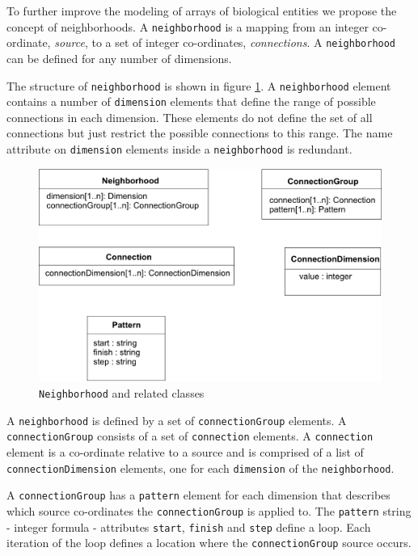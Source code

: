 \documentclass[10pt]{article}
\newcommand{\class}[1]{\texttt{#1}}
\newcommand{\attrib}[1]{\texttt{#1}}
\begin{document}
To further improve the modeling of arrays of biological entities
we propose the concept of neighborhoods.  A \class{neighborhood}
is a mapping from an integer co-ordinate, \emph{source}, to
a set of integer co-ordinates, \emph{connections}.  A
\class{neighborhood} can be defined for any number of dimensions.

The structure of \class{neighborhood} is shown in figure
\ref{fig:neighborhood}.  A \class{neighborhood} element contains
a number of \class{dimension} elements that define the range of
possible connections in each dimension.  These elements do not
define the set of all connections but just restrict the possible
connections to this range.  The name attribute on
\class{dimension} elements inside a \class{neighborhood} is
redundant.

\begin{figure}

  \centering

  \includegraphics[scale = 0.75]{neighborhood}

  \caption{\class{Neighborhood} and related classes}

  \label{fig:neighborhood}

\end{figure}

A \class{neighborhood} is defined by a set of
\class{connectionGroup} elements.  A \class{connectionGroup}
consists of a set of \class{connection} elements. A
\class{connection} element is a co-ordinate relative to a source
 and is comprised of a list of \class{connectionDimension}
elements, one for each \class{dimension} of the
\class{neighborhood}.

A \class{connectionGroup} has a \class{pattern} element for each
dimension that describes which source co-ordinates the
\class{connectionGroup} is applied to.  The \class{pattern}
string - integer formula - attributes \attrib{start},
\attrib{finish} and \attrib{step} define a loop.  Each iteration
of the loop defines a location where the \class{connectionGroup}
source occurs.
\end{document}
